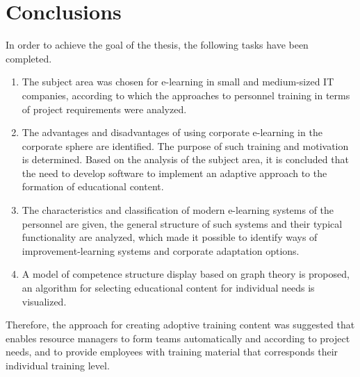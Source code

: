 \documentclass[a4paper,14pt,oneside,final]{extarticle}
\begin{document}
\section{Conclusions}
In order to achieve the goal of the thesis, the following tasks have been completed.
\begin{enumerate}
    \item The subject area was chosen for e-learning in small and medium-sized IT companies, according to which the approaches to personnel training in terms of project requirements were analyzed.
    \item The advantages and disadvantages of using corporate e-learning in the corporate sphere are identified. The purpose of such training and motivation is determined. Based on the analysis of the subject area, it is concluded that the need to develop software to implement an adaptive approach to the formation of educational content.
    \item The characteristics and classification of modern e-learning systems of the personnel are given, the general structure of such systems and their typical functionality are analyzed, which made it possible to identify ways of improvement-learning systems and corporate adaptation options.
    \item A model of competence structure display based on graph theory is proposed, an algorithm for selecting educational content for individual needs is visualized.
\end{enumerate}

Therefore, the approach for creating adoptive training content was suggested that enables resource managers to form teams automatically and according to project needs, and to provide employees with training material that corresponds their individual training level.

\printbibliography[heading=bibintoc, title={References}]
\end{document}
